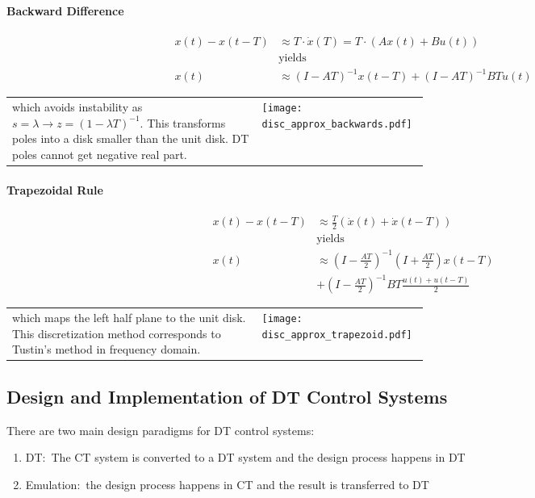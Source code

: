 \paragraph{Backward Difference}
\noindent\begin{align*}
    x(t)-x(t-T) & \approx T\cdot\dot{x}(T) =T\cdot(Ax(t)+Bu(t))  \\
                & \text{yields}                                  \\
    x(t)        & \approx{(I-AT)}^{-1}x(t-T)+{(I-AT)}^{-1}BTu(t)
\end{align*}

\begin{tabularx}{\linewidth}{@{}m{0.6\linewidth}X@{}}
    which avoids instability as $s=\lambda \rightarrow z={(1-\lambda T)}^{-1}$. This transforms poles into a disk smaller than the unit disk. DT poles cannot get negative real part.
     &
    \texttt{[image: disc\_approx\_backwards.pdf]}
\end{tabularx}

\paragraph{Trapezoidal Rule}\label{disc::trapezoid}
\noindent\begin{align*}
    x(t)-x(t-T) & \approx \frac T2\left(\dot{x}(t)+\dot{x}(t-T)\right)                       \\
                & \text{yields}                                                              \\
    x(t)        & \approx{\left(I-\frac{AT}{2}\right)}^{-1}\left(I+\frac{AT}{2}\right)x(t-T) \\
                & +{\left(I-\frac{AT}{2}\right)}^{-1}BT\frac{u(t)+u(t-T)}2
\end{align*}

\begin{tabularx}{\linewidth}{@{}m{0.6\linewidth}X@{}}
    which maps the left half plane to the unit disk. This discretization method corresponds to Tustin's method in frequency domain.
     &
    \texttt{[image: disc\_approx\_trapezoid.pdf]}
\end{tabularx}

\subsection{Design and Implementation of DT Control Systems}
There are two main design paradigms for DT control systems:
\begin{enumerate}
    \item DT:\ The CT system is converted to a DT system and the design process happens in DT
    \item Emulation:\ the design process happens in CT and the result is transferred to DT
\end{enumerate}

